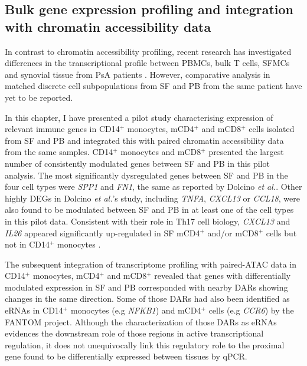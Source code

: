 
\subsection{Bulk gene expression profiling and integration with chromatin accessibility data}

In contrast to chromatin accessibility profiling, recent research has investigated differences in the transcriptional profile between PBMCs, bulk T cells, SFMCs and synovial tissue from PsA patients \parencite{Dolcino2015, Fiocco2015}. However, comparative analysis in matched discrete cell subpopulations from SF and PB from the same patient have yet to be reported. 

In this chapter, I have presented a pilot study characterising expression of relevant immune genes in CD14$^+$ monocytes, mCD4$^+$ and mCD8$^+$ cells isolated from SF and PB and integrated this with paired chromatin accessibility data from the same samples. CD14$^+$ monocytes and mCD8$^+$ presented the largest number of consistently modulated genes between SF and PB in this pilot analysis. The most significantly dysregulated genes between SF and PB in the four cell types were \textit{SPP1} and \textit{FN1}, the same as reported by Dolcino \textit{et al.}.  Other highly DEGs in Dolcino \textit{et al.}’s study, including \textit{TNFA}, \textit{CXCL13} or \textit{CCL18}, were also found to be modulated between SF and PB in at least one of the cell types in this pilot data. Consistent with their role in Th17 cell biology, \textit{CXCL13} and \textit{IL26} appeared significantly up-regulated in SF mCD4$^+$ and/or mCD8$^+$ cells but not in CD14$^+$ monocytes \parencite{Takagi2008}. 

The subsequent integration of transcriptome profiling with paired-ATAC data in CD14$^+$ monocytes, mCD4$^+$ and mCD8$^+$ revealed that genes with differentially modulated expression in SF and PB corresponded with nearby DARs showing changes in the same direction. Some of those DARs had also been identified as eRNAs in CD14$^+$ monocytes (e.g \textit{NFKB1}) and mCD4$^+$ cells (e.g \textit{CCR6}) by the FANTOM project. Although the characterization of those DARs as eRNAs evidences the downstream role of those regions in active transcriptional regulation, it does not unequivocally link this regulatory role to the proximal gene found to be differentially expressed between tissues by qPCR. 


